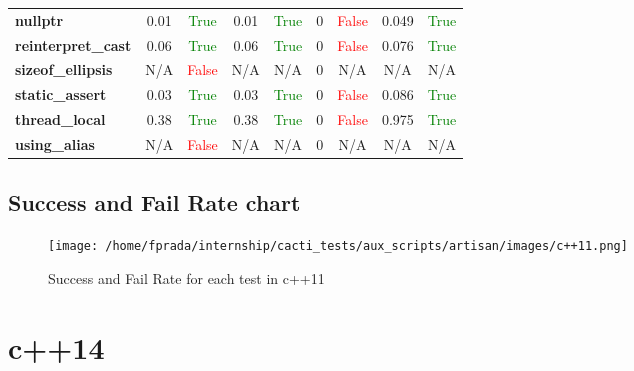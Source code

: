 \documentclass{article}
\begin{document}
\begin{xltabular}{\textwidth}{lcccccccc}
\textbf{{\fontsize{10}{12}\selectfont nullptr}}& 0.01&\textcolor{green}{True}& 0.01&\textcolor{green}{True}& 0&\textcolor{red}{False}& 0.049&\textcolor{green}{True} \\[0.5ex]
\textbf{{\fontsize{10}{12}\selectfont reinterpret\_cast}}& 0.06&\textcolor{green}{True}& 0.06&\textcolor{green}{True}& 0&\textcolor{red}{False}& 0.076&\textcolor{green}{True} \\[0.5ex]
\textbf{{\fontsize{10}{12}\selectfont sizeof\_ellipsis}}& N/A&\textcolor{red}{False}& N/A&N/A& 0&N/A& N/A&N/A \\[0.5ex]
\textbf{{\fontsize{10}{12}\selectfont static\_assert}}& 0.03&\textcolor{green}{True}& 0.03&\textcolor{green}{True}& 0&\textcolor{red}{False}& 0.086&\textcolor{green}{True} \\[0.5ex]
\textbf{{\fontsize{10}{12}\selectfont thread\_local}}& 0.38&\textcolor{green}{True}& 0.38&\textcolor{green}{True}& 0&\textcolor{red}{False}& 0.975&\textcolor{green}{True} \\[0.5ex]
\textbf{{\fontsize{10}{12}\selectfont using\_alias}}& N/A&\textcolor{red}{False}& N/A&N/A& 0&N/A& N/A&N/A \\[0.5ex]
\bottomrule
\end{xltabular}
\newpage
\subsection{Success and Fail Rate chart}
\begin{figure}[h!]
\centering
\texttt{[image: /home/fprada/internship/cacti\_tests/aux\_scripts/artisan/images/c++11.png]}
\caption{Success and Fail Rate for each test in c++11}
\label{fig:c++11}
\end{figure}
\newpage
\section{c++14}
\end{document}
